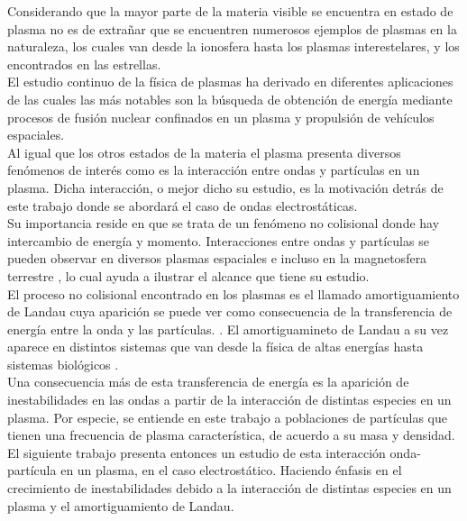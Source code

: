 \documentclass[../tesis_main_file.tex]{subfiles}
\begin{document}

Considerando que la mayor parte de la materia visible se encuentra en estado de plasma \cite{bittencourt2013fundamentals} no es de extrañar que se encuentren numerosos ejemplos de plasmas en la naturaleza, los cuales van desde la ionosfera hasta los plasmas interestelares, y los encontrados en las estrellas.\\
El estudio continuo de la física de plasmas ha derivado en diferentes aplicaciones de las cuales las más notables son la búsqueda de obtención de energía mediante procesos de fusión nuclear confinados en un plasma y propulsión de vehículos espaciales.\\
Al igual que los otros estados de la materia el plasma presenta diversos fenómenos de interés como es la interacción entre ondas y partículas en un plasma. 
Dicha interacción, o mejor dicho su estudio, es la motivación detrás de este trabajo donde se abordará el caso de ondas electrostáticas.\\
Su importancia reside en que se trata de un fenómeno no colisional donde hay intercambio de energía y momento. 
Interacciones entre ondas y partículas se pueden observar en diversos plasmas espaciales e incluso en la magnetosfera terrestre \cite{kitamura2018direct},
lo cual ayuda a ilustrar el alcance que tiene su estudio.\\
El proceso no colisional encontrado en los plasmas es el llamado amortiguamiento de Landau \cite{malmberg1964collisionless,wong1964landau} cuya aparición se puede ver como consecuencia de la transferencia de energía entre la onda y las partículas. \cite{bellan2008fundamentals}.
El amortiguamineto de Landau a su vez aparece en distintos sistemas que van desde la física de altas energías hasta sistemas biológicos \cite{sagan1994physics}.\\
Una consecuencia más de esta transferencia de energía es la aparición de inestabilidades en las ondas a partir de la interacción de distintas especies en un plasma. Por especie, se entiende en este trabajo a poblaciones de partículas que tienen una frecuencia de plasma característica, de acuerdo a su masa y densidad.\\
El siguiente trabajo presenta entonces un estudio de esta interacción onda-partícula en un plasma, en el caso electrostático. Haciendo énfasis en el crecimiento de inestabilidades debido a la interacción de distintas especies en un plasma y el amortiguamiento de Landau.\\
\end{document}
